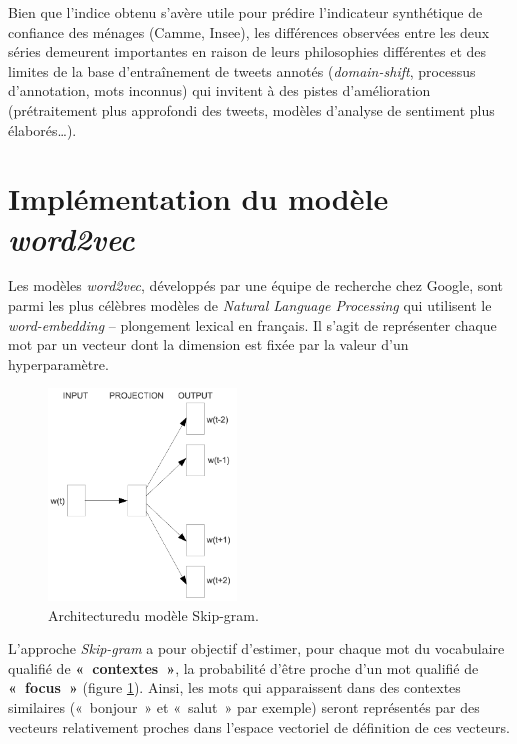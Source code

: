 \documentclass[10pt,french,french]{article}
\begin{document}
\begin{figure}[htb]

\end{figure}

Bien que l'indice obtenu s'avère utile pour prédire l'indicateur
synthétique de confiance des ménages (Camme, Insee), les différences
observées entre les deux séries demeurent importantes en raison de leurs
philosophies différentes et des limites de la base d'entraînement de
tweets annotés (\emph{domain-shift}, processus d'annotation, mots
inconnus) qui invitent à des pistes d'amélioration (prétraitement plus
approfondi des tweets, modèles d'analyse de sentiment plus
élaborés\dots).

\newpage

\section{\texorpdfstring{Implémentation du modèle
\emph{word2vec}}{Implémentation du modèle word2vec}}\label{sec:word2vec}

Les modèles \emph{word2vec}, développés par une équipe de recherche chez
Google, sont parmi les plus célèbres modèles de \emph{Natural Language
Processing} qui utilisent le \emph{word-embedding} -- plongement lexical
en français. Il s'agit de représenter chaque mot par un vecteur dont la
dimension est fixée par la valeur d'un hyperparamètre.

\begin{figure}
\includegraphics[width=5cm]{img/skip_gram.png}
\captionsetup{margin=0cm,format=hang,justification=justified}
\caption{Architecture\newline du modèle Skip-gram.}\label{fig:skipgram}
\end{figure}

L'approche \emph{Skip-gram} a pour objectif d'estimer, pour chaque mot
du vocabulaire qualifié de \textbf{«~contextes~»}, la probabilité d'être
proche d'un mot qualifié de \textbf{«~focus~»} (figure
\ref{fig:skipgram}). Ainsi, les mots qui apparaissent dans des contextes
similaires («~bonjour~» et «~salut~» par exemple) seront représentés par
des vecteurs relativement proches dans l'espace vectoriel de définition
de ces vecteurs.
\end{document}
